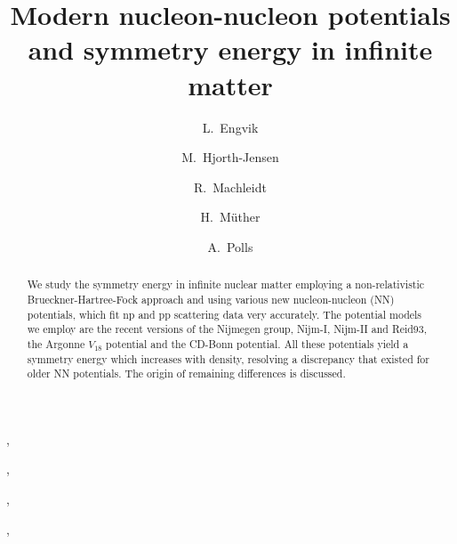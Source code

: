 
\title{Modern nucleon-nucleon potentials and 
       symmetry energy in infinite matter}
 
\author[oslo]{L.\ Engvik}, 
\author[kbh]{M.\ Hjorth-Jensen}, 
\author[idaho]{R.\ Machleidt},  
\author[tuebingen]{H.\ M\"{u}ther},  
\author[barcelona]{A.\ Polls}
\address[oslo]{Department of Physics, University of Oslo, N-0316 Oslo, Norway}
\address[kbh]{Nordita, Blegdamsvej 17, DK-2100 K\o benhavn \O, Denmark}
\address[idaho]{Department of Physics, University of Idaho, Moscow, 
         ID 83844, U.S.A.}
\address[tuebingen]
         {Institut f\"ur Theoretische Physik, Universit\"at T\"ubingen,
         D-72076 T\"ubingen, Germany}
\address[barcelona]{Departament d'Estructura i Costituents de la Mat\`eria,
         Universitat de Barcelona, E-08028 Barcelona, Spain}

\maketitle

\begin{abstract}

We study the symmetry energy in infinite nuclear
matter employing a non-relativistic Brueckner-Hartree-Fock approach
and using various new nucleon-nucleon (NN) potentials, 
which fit np and pp scattering
data very accurately. The potential models we employ
are the recent
versions of the Nijmegen group, Nijm-I, Nijm-II and Reid93, 
the Argonne $V_{18}$ potential and the CD-Bonn potential.
All these potentials yield a symmetry energy which increases with density,
resolving a discrepancy that existed for older
NN potentials. The origin of remaining differences is
discussed.

\end{abstract}
